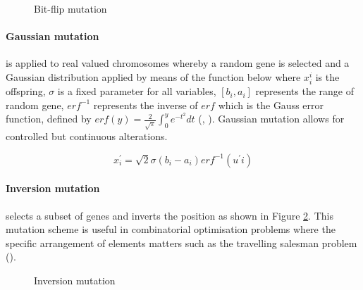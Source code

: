 \parbreak
\begin{figure}[H] %
	\centering %
	\caption{Bit-flip mutation}
	\label{fig:bitflip} %
\end{figure}

\parbreak\noindent \paragraph{Gaussian mutation} is applied to real valued chromosomes whereby a random gene is selected and a Gaussian distribution applied by means of the function below where $x_{i}^{i}$ is the offspring, $\sigma$ is a fixed parameter for all variables, $[b_{i}, a_{i}]$ represents the range of random gene, $erf^{-1}$ represents the inverse of $erf$ which is the Gauss error function, defined by $erf(y) = \frac{2}{\sqrt{\pi}}\int^{y}_{0}e^{-t^2}dt$ (\cite{bell2022applicationsgaussianmutationself}, \cite{gaussianMutation}). Gaussian mutation allows for controlled but continuous alterations.
\begin{ceqn}
	\begin{equation}
		x_{i}^{'} = \sqrt{2} \sigma(b_{i} - a_{i}) erf^{-1}(u^{'}i)
	\end{equation}	
\end{ceqn}

\parbreak\noindent \paragraph{Inversion mutation} selects a subset of genes and inverts the position as shown in Figure \ref{fig:inversion}. This mutation scheme is useful in combinatorial optimisation problems where the specific arrangement of elements matters such as the travelling salesman problem (\cite{intelligentOptimization}).
	
\parbreak
\begin{figure}[H] %
	\centering %
	\caption{Inversion mutation}
	\label{fig:inversion} %
\end{figure}

